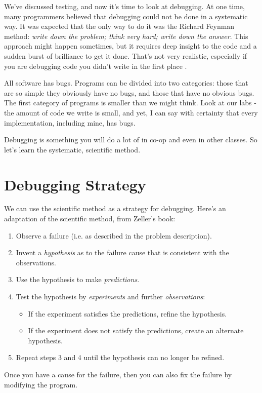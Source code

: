 




We've discussed testing, and now it's time to look at debugging. At one time, many programmers believed that debugging could not be done in a systematic way. It was expected that the only way to do it was the Richard Feynman method: \emph{write down the problem; think very hard; write down the answer}. This approach might happen sometimes, but it requires deep insight to the code and a sudden burst of brilliance to get it done. That's not very realistic, especially if you are debugging code you didn't write in the first place \cite{dgtd}.

All software has bugs. Programs can be divided into two categories: those that are so simple they obviously have no bugs, and those that have no obvious bugs. The first category of programs is smaller than we might think. Look at our labs - the amount of code we write is small, and yet, I can say with certainty that every implementation, including mine, has bugs.

Debugging is something you will do a lot of in co-op and even in other classes. So let's learn the systematic, scientific method.

\section*{Debugging Strategy} 
We can use the scientific method as a strategy for debugging.
Here's an adaptation of the scientific method, from Zeller's book:
\begin{enumerate}
\item Observe a failure (i.e. as described in the problem description).
\item Invent a \emph{hypothesis} as to the failure cause that
is consistent with the observations.
\item Use the hypothesis to make \emph{predictions}.
\item Test the hypothesis by \emph{experiments} and further
\emph{observations}:
\begin{itemize}
\item If the experiment satisfies the predictions, refine the hypothesis.
\item If the experiment does not satisfy the predictions, create an alternate hypothesis.
\end{itemize}
\item Repeat steps 3 and 4 until the hypothesis can no longer be refined.
\end{enumerate}
Once you have a cause for the failure, then you can also fix the failure
by modifying the program. 

